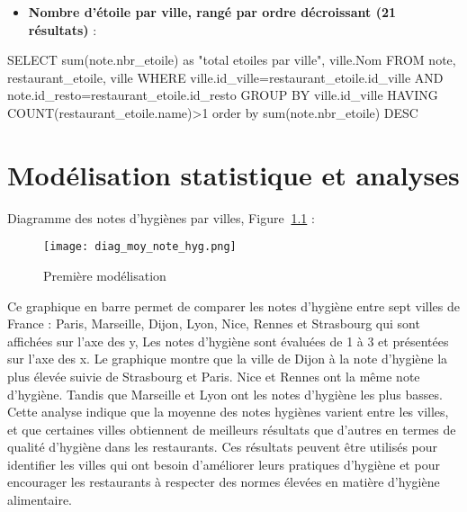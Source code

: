 \documentclass[mstat,12pt]{unswthesis}
\newenvironment{Shaded}{\begin{snugshade}}{\end{snugshade}}
\newcommand{\DecValTok}[1]{\textcolor[rgb]{0.00,0.00,0.81}{#1}}
\newcommand{\FunctionTok}[1]{\textcolor[rgb]{0.00,0.00,0.00}{#1}}
\newcommand{\NormalTok}[1]{#1}
\newcommand{\OtherTok}[1]{\textcolor[rgb]{0.56,0.35,0.01}{#1}}
\newcommand{\SpecialCharTok}[1]{\textcolor[rgb]{0.00,0.00,0.00}{#1}}
\newcommand{\StringTok}[1]{\textcolor[rgb]{0.31,0.60,0.02}{#1}}
\begin{document}
\medskip

\begin{itemize}
\tightlist
\item
  \textbf{Nombre d'étoile par ville, rangé par ordre décroissant (21
  résultats)} :
\end{itemize}

\begin{Shaded}
\begin{Highlighting}[]
\NormalTok{SELECT }\FunctionTok{sum}\NormalTok{(note.nbr\_etoile) as }\StringTok{"total etoiles par ville"}\NormalTok{, ville.Nom}
\NormalTok{FROM note, restaurant\_etoile, ville}
\NormalTok{WHERE ville.id\_ville}\OtherTok{=}\NormalTok{restaurant\_etoile.id\_ville}
\NormalTok{AND note.id\_resto}\OtherTok{=}\NormalTok{restaurant\_etoile.id\_resto}
\NormalTok{GROUP BY ville.id\_ville}
\NormalTok{HAVING }\FunctionTok{COUNT}\NormalTok{(restaurant\_etoile.name)}\SpecialCharTok{\textgreater{}}\DecValTok{1}
\NormalTok{order by }\FunctionTok{sum}\NormalTok{(note.nbr\_etoile) DESC }
\end{Highlighting}
\end{Shaded}

\hypertarget{moduxe9lisation-statistique-et-analyses}{%
\chapter{Modélisation statistique et
analyses}\label{moduxe9lisation-statistique-et-analyses}}

Diagramme des notes d'hygiènes par villes, Figure \(~\)\ref{diag1} :

\begin{figure}
\hypertarget{diag1}{%
\centering
\texttt{[image: diag\_moy\_note\_hyg.png]}
\caption{Première modélisation}\label{diag1}
}
\end{figure}

\bigskip
\bigskip

Ce graphique en barre permet de comparer les notes d'hygiène entre sept
villes de France : Paris, Marseille, Dijon, Lyon, Nice, Rennes et
Strasbourg qui sont affichées sur l'axe des y, Les notes d'hygiène sont
évaluées de 1 à 3 et présentées sur l'axe des x. Le graphique montre que
la ville de Dijon à la note d'hygiène la plus élevée suivie de
Strasbourg et Paris. Nice et Rennes ont la même note d'hygiène. Tandis
que Marseille et Lyon ont les notes d'hygiène les plus basses. Cette
analyse indique que la moyenne des notes hygiènes varient entre les
villes, et que certaines villes obtiennent de meilleurs résultats que
d'autres en termes de qualité d'hygiène dans les restaurants. Ces
résultats peuvent être utilisés pour identifier les villes qui ont
besoin d'améliorer leurs pratiques d'hygiène et pour encourager les
restaurants à respecter des normes élevées en matière d'hygiène
alimentaire. \bigskip
\end{document}
